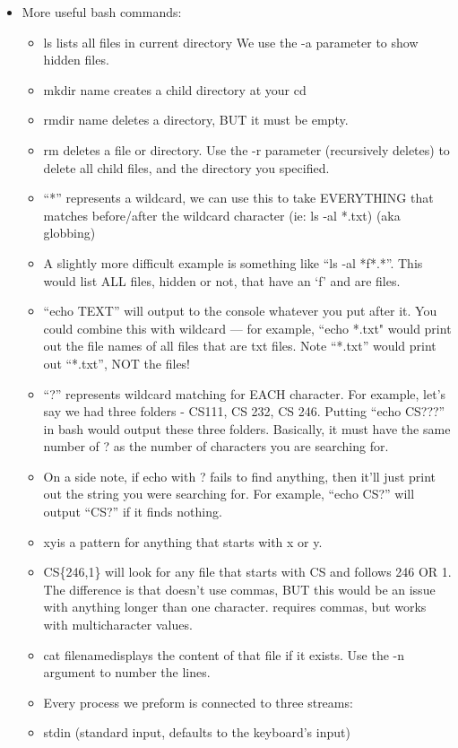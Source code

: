 \documentclass{article}
\begin{document}
\begin{itemize}
\item More useful bash commands:
\begin{itemize}
\item ls lists all files in current directory  We use the -a parameter to show hidden files.
\item mkdir name creates a child directory at your cd
\item rmdir name deletes a directory, BUT it must be empty.  
\item rm deletes a file or directory.  Use the -r parameter (recursively deletes) to delete all child files, and the directory you specified.
\item  ``*'' represents a  wildcard, we can use this to take EVERYTHING that matches before/after the wildcard character (ie: ls -al *.txt) (aka globbing)
\item A slightly more difficult example is something like ``ls -al *f*.*''.  This would list ALL files, hidden or not, that have an ‘f’ and are files.
\item  ``echo TEXT'' will output to the console whatever you put after it.  You could combine this with wildcard --- for example, “echo *.txt" would print out the file names of all files that are txt files.  Note “*.txt” would print out “*.txt”, NOT the files!
\item  ``?'' represents wildcard matching for EACH character.  For example, let's say we had three folders - CS111, CS 232, CS 246.  Putting ``echo CS???'' in bash would output these three folders.  Basically, it must have the same number of ? as the number of characters you are searching for.
\item  On a side note, if echo with ? fails to find anything, then it'll just print out the string you were searching for.  For example, ``echo CS?'' will output ``CS?'' if it finds nothing.
\item  \lbrack xy\rbrack is a pattern for anything that starts with x or y.
\item  CS\{246,1\} will look for any file that starts with CS and follows 246 OR 1.  The difference is that \lbrack \rbrack doesn't use commas, BUT this would be an issue with anything longer than one character.  {} requires commas, but works with multicharacter values.
\item  cat \lbrack filename\rbrack displays the content of that file if it exists.  Use the -n argument to number the lines.
\item  Every process we preform is connected to three streams:
\item  stdin (standard input, defaults to the keyboard's input)

\end{itemize}
\end{itemize}
\end{document}
